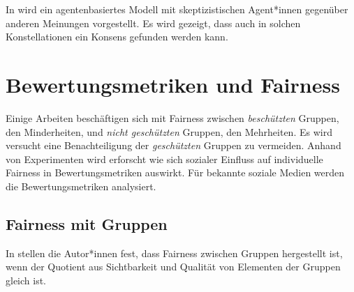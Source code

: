 In \cite{Tsang2014277} wird ein agentenbasiertes Modell mit skeptizistischen Agent*innen gegenüber anderen Meinungen vorgestellt. Es wird gezeigt, dass auch in solchen Konstellationen ein Konsens gefunden werden kann.

\section{Bewertungsmetriken und Fairness}

Einige Arbeiten beschäftigen sich mit Fairness zwischen \textit{beschützten} Gruppen, den Minderheiten, und \textit{nicht geschützten} Gruppen, den Mehrheiten. Es wird versucht eine Benachteiligung der \textit{geschützten} Gruppen zu vermeiden. Anhand von Experimenten wird erforscht wie sich sozialer Einfluss auf individuelle Fairness in Bewertungsmetriken auswirkt. Für bekannte soziale Medien werden die Bewertungsmetriken analysiert.





\subsection{Fairness mit Gruppen}

In \cite{castillo} stellen die Autor*innen fest, dass Fairness zwischen Gruppen hergestellt ist, wenn der Quotient aus Sichtbarkeit und Qualität von Elementen der Gruppen gleich ist.

